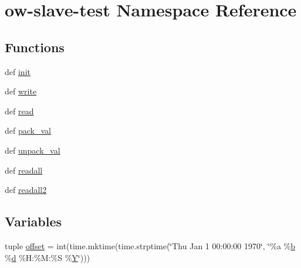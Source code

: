 \hypertarget{namespaceow-slave-test}{\section{ow-\/slave-\/test Namespace Reference}
\label{namespaceow-slave-test}
}
\subsection*{Functions}
\begin{DoxyCompactItemize}
\item 
def \hyperlink{namespaceow-slave-test_ab091aabaec0d431fbd8f2966c4ad2b34}{init}
\item 
def \hyperlink{namespaceow-slave-test_a6208e9fac4a2985c7004148f0c6f3a0b}{write}
\item 
def \hyperlink{namespaceow-slave-test_a91854caa9cb46af512a1868311c2eb26}{read}
\item 
def \hyperlink{namespaceow-slave-test_a64b1d041927699889619c1d9164a23b4}{pack\-\_\-val}
\item 
def \hyperlink{namespaceow-slave-test_ac894ce4758d4c4841f29c609063bf5a2}{unpack\-\_\-val}
\item 
def \hyperlink{namespaceow-slave-test_a84f5a1017b72cca872e223e58758e94f}{readall}
\item 
def \hyperlink{namespaceow-slave-test_a7c6f6e730ee5db6816886742e49355b5}{readall2}
\end{DoxyCompactItemize}
\subsection*{Variables}
\begin{DoxyCompactItemize}
\item 
tuple \hyperlink{namespaceow-slave-test_aabcf0d09fb3ab10a273d0b662db302c3}{offset} = int(time.\-mktime(time.\-strptime(\char`\"{}Thu Jan 1 00\-:00\-:00 1970\char`\"{}, \char`\"{}\%a \%\hyperlink{IMU_8cpp_a20f3a6e8a2ba2537edf801801628417b}{b} \%\hyperlink{OWGeneric__DangerShield_8ino_a22871ee78191bcd7676a38358795104e}{d} \%H\-:\%M\-:\%S \%\hyperlink{OWGeneric__SensorStation_8ino_ac915220fb659eb2c5958a1ccd81b80d4}{Y}\char`\"{})))
\end{DoxyCompactItemize}


